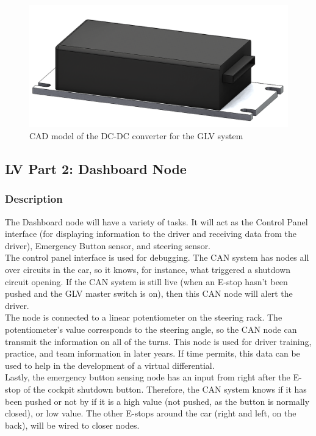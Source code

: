 \documentclass{article}
\begin{document}
            \begin{figure}[H]
                \centering
                \includegraphics[width = 0.6 \textwidth]{GLV_DCDC}
                \caption{CAD model of the DC-DC converter for the GLV system}
                \label{dcdc_cad}
            \end{figure}

    \subsection{LV Part 2: Dashboard Node}

        \subsubsection{Description}

            The Dashboard node will have a variety of tasks. It will act as the Control Panel interface (for displaying information to the driver and receiving data from the driver), Emergency Button sensor, and steering sensor.\\

            The control panel interface is used for debugging. The CAN system has nodes all over circuits in the car, so it knows, for instance, what triggered a shutdown circuit opening. If the CAN system is still live (when an E-stop hasn't been pushed and the GLV master switch is on), then this CAN node will alert the driver.\\

            The node is connected to a linear potentiometer on the steering rack. The potentiometer's value corresponds to the steering angle, so the CAN node can transmit the information on all of the turns. This node is used for driver training, practice, and team information in later years. If time permits, this data can be used to help in the development of a virtual differential.\\

            Lastly, the emergency button sensing node has an input from right after the E-stop of the cockpit shutdown button. Therefore, the CAN system knows if it has been pushed or not by if it is a high value (not pushed, as the button is normally closed), or low value. The other E-stops around the car (right and left, on the back), will be wired to closer nodes.
\end{document}
